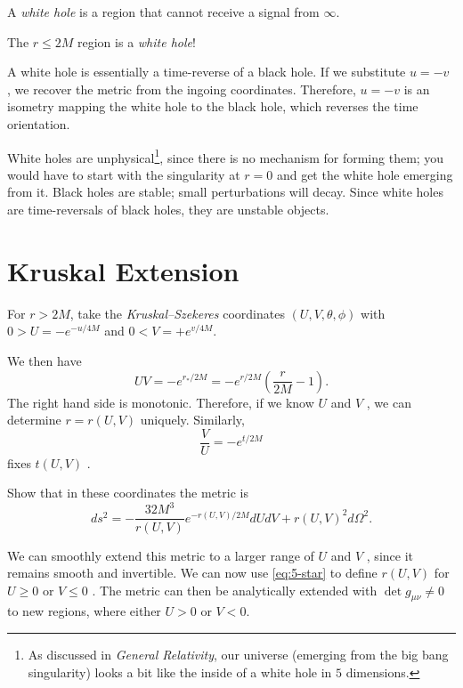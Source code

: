 \begin{definition}
  A \emph{white hole} is a region that cannot receive a signal from $\infty$.
\end{definition}

The $r \leq 2M$  region is a \emph{white hole}!

A white hole is essentially a time-reverse of a black hole.
If we substitute $u = -v$ , we recover the metric from the ingoing coordinates.
Therefore, $u = -v$  is an isometry mapping the white hole to the black hole, which reverses the time orientation.

White holes are unphysical\footnote{As discussed in \emph{General Relativity}, our universe (emerging from the big bang singularity) looks a bit like the inside of a white hole in $5$ dimensions.}, since there is no mechanism for forming them; you would have to start with the singularity at $r = 0$ and get the white hole emerging from it.
Black holes are stable; small perturbations will decay. Since white holes are time-reversals of black holes, they are unstable objects. 

\section{Kruskal Extension}%
\label{sec:kruskal_extension}

\begin{definition}[]
  For $r > 2M$, take the \emph{Kruskal--Szekeres} coordinates $(U, V, \theta, \phi)$ with $0> U = -e^{-u / 4M}$ and $0< V = +e^{v / 4M}$.
\end{definition}

We then have
\begin{equation}
  UV = -e ^{r_* / 2M} = -e^{r / 2M} (\frac{r}{2M} - 1) \label{eq:5-star}.
\end{equation}
The right hand side is monotonic. Therefore, if we know $U$  and $V$ , we can determine $r = r(U, V)$  uniquely.
Similarly, 
\begin{equation}
  \frac{V}{U} = -e^{t / 2M}
\end{equation}
fixes $t (U, V)$ .
\begin{exercise}
  Show that in these coordinates the metric is
  \begin{equation}
    ds^2 = -\frac{32M^3}{ r(U, V)} e^{-r(U, V) / 2M} dU dV + r(U, V)^2 d\Omega^2.
  \end{equation}
\end{exercise}
We can smoothly extend this metric to a larger range of $U$ and  $V$ , since it remains smooth and invertible.
We can now use \eqref{eq:5-star} to define $r(U, V)$  for $U \geq 0$  or $V \leq 0$ . The metric can then be analytically extended with $\det g_{\mu\nu} \neq 0$  to new regions, where either $U > 0$ or  $V < 0$. 

